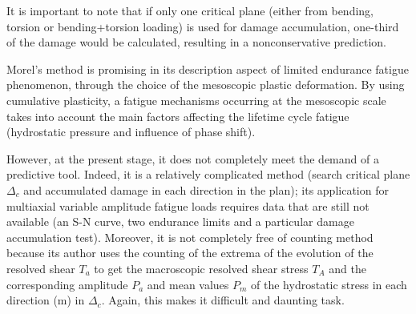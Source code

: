 It is important to note that if only one critical plane
(either from bending, torsion or bending+torsion
loading) is used for damage accumulation, one-third of
the damage would be calculated, resulting in a nonconservative prediction.

Morel's method is promising in its description aspect of limited endurance fatigue phenomenon, through the choice of the  mesoscopic plastic deformation. By using cumulative plasticity, a fatigue mechanisms occurring at the mesoscopic scale takes into account the main factors affecting the lifetime cycle fatigue (hydrostatic pressure and influence of phase shift). 

However, at the present stage, it does not completely meet the demand of a predictive tool. Indeed, it is a relatively complicated method (search critical plane $\Delta_c$ and accumulated damage in each direction in the plan); its application for multiaxial variable amplitude fatigue loads requires data that are still not available (an S-N curve, two endurance limits and a particular  damage accumulation test). Moreover, it is not completely free of counting method because its author uses the counting of the extrema of the evolution of the resolved shear $T_a$ to get the macroscopic resolved shear stress $T_A$ and the corresponding amplitude $P_a$ and mean values $P_m$ of the hydrostatic stress in each direction (m) in $\Delta_c$. Again, this makes it difficult and daunting task.
